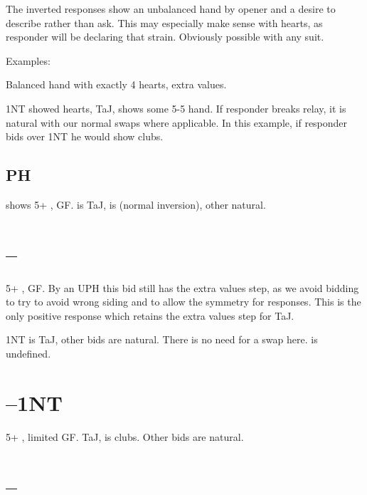 \documentclass[tom-ari]{subfile}
\begin{document}
	The inverted responses show an unbalanced hand by opener and a desire to describe rather than ask. This may especially make sense with hearts, as responder will be declaring that strain. Obviously possible with any suit.
	
	Examples:
	
	
	Balanced hand with exactly 4 hearts, extra values.
	
	
	1NT showed hearts,  TaJ,  shows some 5-5 hand. If responder breaks relay, it is natural with our normal swaps where applicable. In this example, if responder bids  over 1NT he would show clubs.
	
	\subsection{PH}	
	
	 shows 5+ \clubsuit, GF.   is TaJ,  is \heartsuit (normal inversion), other natural. 
	
	
	\section[1C--1S]{--}
	
	5+ \heartsuit, GF. By an UPH this bid still has the extra values step, as we avoid bidding  to try to avoid wrong siding and to allow the symmetry for responses. This is the only positive response which retains the extra values step for TaJ.
	
	1NT is TaJ, other bids are natural. There is no need for a swap here.  is undefined.
	
	\section[1C--1NT]{--1NT}
	
	5+ \spadesuit, limited GF.  TaJ,  is clubs. Other bids are natural.
	
	\section[1C--2C]{--}
	
\end{document}
